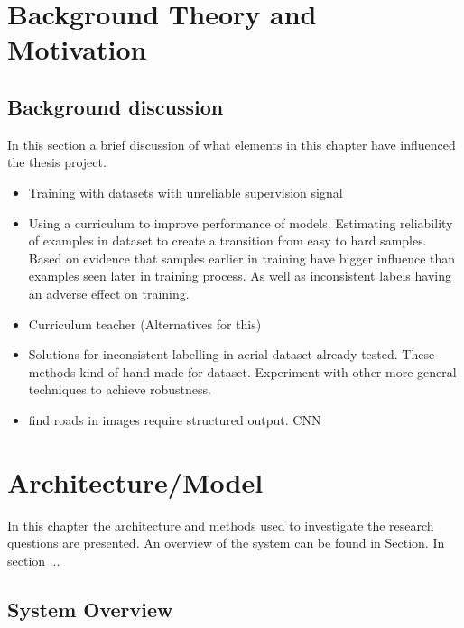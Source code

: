 \documentclass[a4paper]{book}
\begin{document}
\chapter{Background Theory and Motivation}\label{T-B}
\label{cha:TheoryAndBackground}







\section{Background discussion}
\label{sec:backgroundDiscussion}
In this section a brief discussion of what elements in this chapter have influenced the thesis project.

\begin{itemize}
\item Training with datasets with unreliable supervision signal
\item Using a curriculum to improve performance of models. Estimating reliability of 
examples in dataset to create a transition from easy to hard samples. Based on 
evidence that samples earlier in training have bigger influence than examples seen later in training process. As well as inconsistent labels having an adverse effect on 
training.
\item Curriculum teacher (Alternatives for this)
\item Solutions for inconsistent labelling in aerial dataset already tested. These methods kind of hand-made  for dataset.
Experiment with other more general techniques to achieve robustness.
\item find roads in images require structured output. CNN 
\end{itemize}
\chapter{Architecture/Model}
\label{cha:architectureAndModel}
In this chapter the architecture and methods used to investigate the research questions are presented. An overview of the system can be found in Section.  In section ...

\section{System Overview}
\label{sec:systemOverview}
\end{document}
